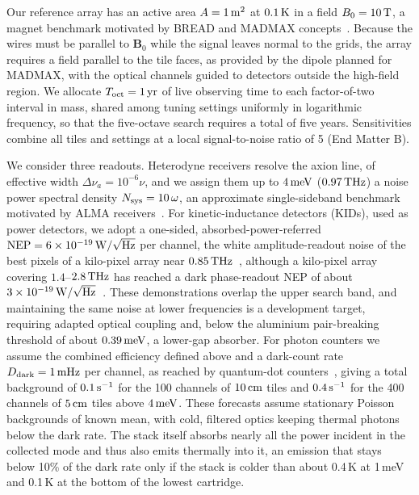 \documentclass[
  aps,prl,reprint,superscriptaddress,
  amsmath,amssymb,floatfix,nofootinbib
]{revtex4-2}
\begin{document}
Our reference array has an active area $A=1\,{\rm m^2}$ at $0.1\,{\rm K}$ in a field $B_0=10\,{\rm T}$, a magnet benchmark motivated by BREAD and MADMAX concepts~\cite{BREAD:2021tpx,MADMAX:2019pub}. Because the wires must be parallel to $\mathbf B_0$ while the signal leaves normal to the grids, the array requires a field parallel to the tile faces, as provided by the dipole planned for MADMAX, with the optical channels guided to detectors outside the high-field region. We allocate $T_{\rm oct}=1\,{\rm yr}$ of live observing time to each factor-of-two interval in mass, shared among tuning settings uniformly in logarithmic frequency, so that the five-octave search requires a total of five years. Sensitivities combine all tiles and settings at a local signal-to-noise ratio of 5 (End Matter B).

We consider three readouts. Heterodyne receivers resolve the axion line, of effective width $\Delta\nu_a=10^{-6}\nu$, and we assign them up to $4\,{\rm meV}$ ($0.97\,{\rm THz}$) a noise power spectral density $N_{\rm sys}=10\,\omega$, an approximate single-sideband benchmark motivated by ALMA receivers~\cite{Uzawa:2021,Kerr:2014alma,Baryshev:2015alma}. For kinetic-inductance detectors (KIDs), used as power detectors, we adopt a one-sided, absorbed-power-referred ${\rm NEP}=6\times10^{-19}\,{\rm W/\sqrt{Hz}}$ per channel, the white amplitude-readout noise of the best pixels of a kilo-pixel array near $0.85\,{\rm THz}$~\cite{Baselmans:2017kid}, although a kilo-pixel array covering $1.4$--$2.8\,{\rm THz}$ has reached a dark phase-readout NEP of about $3\times10^{-19}\,{\rm W/\sqrt{Hz}}$~\cite{Bueno:2018kid}. These demonstrations overlap the upper search band, and maintaining the same noise at lower frequencies is a development target, requiring adapted optical coupling and, below the aluminium pair-breaking threshold of about $0.39\,{\rm meV}$, a lower-gap absorber. For photon counters we assume the combined efficiency defined above and a dark-count rate $D_{\rm dark}=1\,{\rm mHz}$ per channel, as reached by quantum-dot counters~\cite{Komiyama:2000,Ikushima:2010}, giving a total background of $0.1\,{\rm s^{-1}}$ for the 100 channels of $10\,{\rm cm}$ tiles and $0.4\,{\rm s^{-1}}$ for the 400 channels of $5\,{\rm cm}$ tiles above $4\,{\rm meV}$. These forecasts assume stationary Poisson backgrounds of known mean, with cold, filtered optics keeping thermal photons below the dark rate. The stack itself absorbs nearly all the power incident in the collected mode and thus also emits thermally into it, an emission that stays below 10\% of the dark rate only if the stack is colder than about 0.4\,K at 1\,meV and 0.1\,K at the bottom of the lowest cartridge. 
\end{document}
